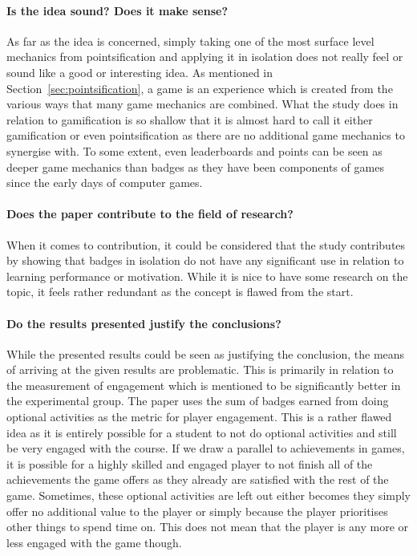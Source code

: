 \paragraph{Is the idea sound? Does it make sense?}
As far as the idea is concerned, simply taking one of the most surface level mechanics from pointsification and applying it in isolation does not really feel or sound like a good or interesting idea. As mentioned in Section~\ref{sec:pointsification}, a game is an experience which is created from the various ways that many game mechanics are combined. What the study does in relation to gamification is so shallow that it is almost hard to call it either gamification or even pointsification as there are no additional game mechanics to synergise with. To some extent, even leaderboards and points can be seen as deeper game mechanics than badges as they have been components of games since the early days of computer games. 

\paragraph{Does the paper contribute to the field of research?}
When it comes to contribution, it could be considered that the study contributes by showing that badges in isolation do not have any significant use in relation to learning performance or motivation. While it is nice to have some research on the topic, it feels rather redundant as the concept is flawed from the start. 

\paragraph{Do the results presented justify the conclusions?} 
While the presented results could be seen as justifying the conclusion, the means of arriving at the given results are problematic. This is primarily in relation to the measurement of engagement which is mentioned to be significantly better in the experimental group. The paper uses the sum of badges earned from doing optional activities as the metric for player engagement. This is a rather flawed idea as it is entirely possible for a student to not do optional activities and still be very engaged with the course. If we draw a parallel to achievements in games, it is possible for a highly skilled and engaged player to not finish all of the achievements the game offers as they already are satisfied with the rest of the game. Sometimes, these optional activities are left out either becomes they simply offer no additional value to the player or simply because the player prioritises other things to spend time on. This does not mean that the player is any more or less engaged with the game though. 

